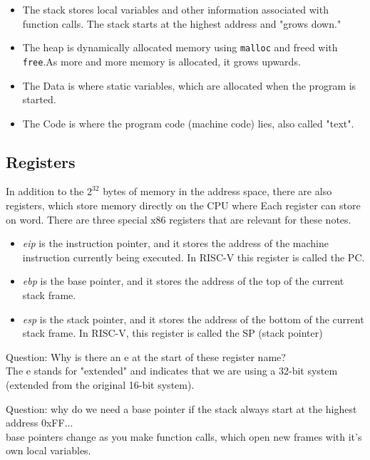 \documentclass{article}
\begin{document}
\begin{itemize}
    \item The stack stores local variables and other information associated with function calls. The stack starts at the highest address and "grows down."

    \item The heap is dynamically allocated memory using \lstinline{malloc} and freed with \lstinline{free}.As more and more memory is allocated, it grows upwards.

    \item The Data is where static variables, which are allocated when the program is started.

    \item The Code is where the program code (machine code) lies, also called "text".
\end{itemize}


\subsection{Registers}
In addition to the $2^{32}$ bytes of memory in the address space, there are also registers, which store memory directly on the CPU where Each register can store on word. There are three special x86 registers that are relevant for these notes.

\begin{itemize}
    \item \emph{eip} is the instruction pointer, and it stores the address of the machine instruction currently being executed. In RISC-V this register is called the PC.
    \item \emph{ebp} is the base pointer, and it stores the address of the top of the current stack frame.
    \item \emph{esp} is the stack pointer, and it stores the address of the bottom of the current stack frame. In RISC-V, this register is called the SP (stack pointer)
\end{itemize}


{\color{red} Question: Why is there an e at the start of these register name?}\\
The e stands for "extended" and indicates that we are using a 32-bit system (extended from the original 16-bit system).

    {\color{red} Question: why do we need a base pointer if the stack always start at the highest address 0xFF...}\\
base pointers change as you make function calls, which open new frames with it's own local variables.
\end{document}
